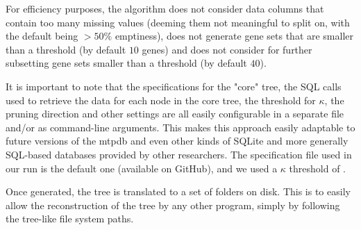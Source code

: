 For efficiency purposes, the algorithm does not consider data columns that contain too many missing values (deeming them not meaningful to split on, with the default being $> 50\%$ emptiness), does not generate gene sets that are smaller than a threshold (by default $10$ genes) and does not consider for further subsetting gene sets smaller than a threshold (by default $40$).

It is important to note that the specifications for the "core" tree, the SQL calls used to retrieve the data for each node in the core tree, the threshold for $\kappa$, the pruning direction and other settings are all easily configurable in a separate file and/or as command-line arguments. This makes this approach easily adaptable to future versions of the \gls{mtpdb} and even other kinds of SQLite and more generally SQL-based databases provided by other researchers. The specification file used in our run is the default one (available on GitHub), and we used a $\kappa$ threshold of .

Once generated, the tree is translated to a set of folders on disk. This is to easily allow the reconstruction of the tree by any other program, simply by following the tree-like file system paths.

